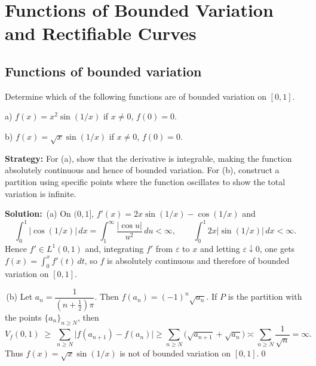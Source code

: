 \chapter{Functions of Bounded Variation and Rectifiable Curves}

\section{Functions of bounded variation}


\begin{problembox}
\begin{problemstatement}
Determine which of the following functions are of bounded variation on $[0, 1]$.

a) $f(x) = x^2 \sin (1/x)$ if $x \neq 0$, $f(0) = 0$.

b) $f(x) = \sqrt{x} \sin (1/x)$ if $x \neq 0$, $f(0) = 0$.
\end{problemstatement}
\end{problembox}

\noindent\textbf{Strategy:} For (a), show that the derivative is integrable, making the function absolutely continuous and hence of bounded variation. For (b), construct a partition using specific points where the function oscillates to show the total variation is infinite.

\bigskip\noindent\textbf{Solution:}
\,(a) On $(0,1]$, $f'(x)=2x\sin(1/x)-\cos(1/x)$ and
\[\int_0^1 |\cos(1/x)|\,dx=\int_1^{\infty}\frac{|\cos u|}{u^2}\,du<\infty,\qquad \int_0^1 2x|\sin(1/x)|\,dx<\infty.
\]
Hence $f'\in L^1(0,1)$ and, integrating $f'$ from $\varepsilon$ to $x$ and letting $\varepsilon\downarrow 0$, one gets $f(x)=\int_0^x f'(t)\,dt$, so $f$ is absolutely continuous and therefore of bounded variation on $[0,1]$.

\,(b) Let $a_n=\dfrac{1}{(n+\tfrac12)\pi}$. Then $f(a_n)=(-1)^n\sqrt{a_n}$. If $P$ is the partition with the points $\{a_n\}_{n\ge N}$, then
\[V_f(0,1)\;\ge\;\sum_{n\ge N}\big|f(a_{n+1})-f(a_n)\big|\ge \sum_{n\ge N}\big(\sqrt{a_{n+1}}+\sqrt{a_n}\big)\asymp\sum_{n\ge N}\frac{1}{\sqrt{n}}=\infty.
\]
Thus $f(x)=\sqrt{x}\sin(1/x)$ is not of bounded variation on $[0,1]$.\qed


